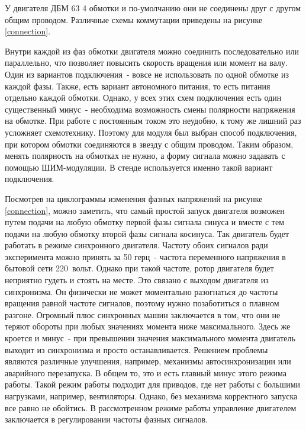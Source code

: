 У двигателя ДБМ 63 4 обмотки и по-умолчанию они не соединены друг с другом общим проводом.
Различные схемы коммутации приведены на рисунке \ref{connection}.

Внутри каждой из фаз обмотки двигателя можно соединить последовательно или параллельно,
что позволяет повысить скорость вращения или момент на валу. Один из вариантов подключения~- 
вовсе не использовать по одной обмотке из каждой фазы. Также, есть вариант автономного
питания, то есть питания отдельно каждой обмотки. Однако, у всех этих схем подключения есть
один существенный минус~- необходима возможность смены полярности напряжения на обмотке.
При работе с постоянным током это неудобно, к тому же лишний раз усложняет схемотехнику.
Поэтому для модуля был выбран способ подключения, при котором обмотки соединяются
в звезду с общим проводом. Таким образом, менять полярность на обмотках не нужно,
а форму сигнала можно задавать с помощью ШИМ-модуляции. В стенде используется именно
такой вариант подключения.


Посмотрев на циклограммы изменения фазных напряжений на рисунке \ref{connection},
можно заметить, что самый простой запуск двигателя возможен путем подачи на 
любую обмотку первой фазы сигнала синуса и вместе с тем подачи на любую обмотку 
второй фазы сигнала косинуса. Так двигатель будет работать в режиме синхронного двигателя.
Частоту обоих сигналов ради эксперимента можно принять
за 50 герц~- частота переменного напряжения в бытовой сети 220~вольт.
Однако при такой частоте, ротор двигателя будет неприятно гудеть и стоять на месте. 
Это связано с выходом двигателя из синхронизма. Он физически не может моментально 
разогнаться до частоты вращения равной частоте сигналов, поэтому нужно позаботиться 
о плавном разгоне. Огромный плюс синхронных машин заключается в том, что они не 
теряют обороты при любых значениях момента ниже максимального. Здесь же кроется 
и минус~- при превышении значения максимального момента двигатель выходит из 
синхронизма и просто останавливается. Решением проблемы являются различные улучшения,
например, механизмы автосинхронизации или аварийного перезапуска.
В общем то, это и есть главный минус этого режима работы. Такой режим работы подходит
для приводов, где нет работы с большими нагрузками, например, вентиляторы. 
Однако, без механизма корректного запуска все равно не обойтись.
В рассмотренном режиме работы управление двигателем заключается 
в регулировании частоты фазных сигналов.

